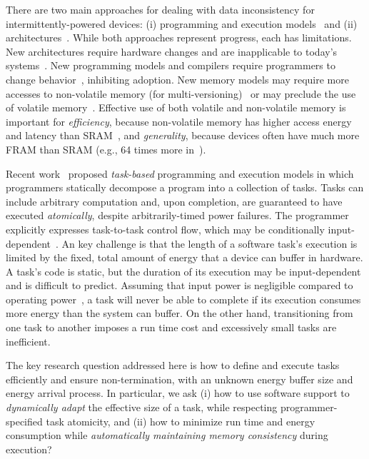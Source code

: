 There are two main approaches for dealing with data inconsistency for intermittently-powered devices: (i) programming and execution models~\cite{dino,ratchet,chain,alpaca} and (ii) architectures~\cite{hicks_isca_2017,idetic,nvp,tictpl}. While both approaches represent progress, each has limitations. New architectures require hardware changes and are inapplicable to today's systems~\cite{hicks_isca_2017,nvp}. New programming models and compilers require programmers to change behavior~\cite{chain,ratchet}, inhibiting adoption. New memory models may require more accesses to non-volatile memory (for multi-versioning)~\cite{dino,chain} or may preclude the use of volatile memory~\cite{ratchet}. Effective use of both volatile and non-volatile memory is important for \emph{efficiency}, because non-volatile memory has higher access energy and latency than SRAM~\cite{nvp}, and \emph{generality}, because devices often have much more FRAM than SRAM (e.g., 64 times more in~\cite{wolverine}). 

Recent work~\cite{alpaca,chain} proposed {\em task-based} programming and execution models in which programmers statically decompose a program into a collection of tasks. Tasks can include arbitrary computation and, upon completion, are guaranteed to have executed {\em atomically}, despite arbitrarily-timed power failures. The programmer explicitly expresses task-to-task control flow, which may be conditionally input-dependent~\cite{chain}. An key challenge is that the length of a software task's execution is limited by the fixed, total amount of energy that a device can buffer in hardware. A task's code is static, but the duration of its execution may be input-dependent and is difficult to predict. Assuming that input power is negligible compared to operating power~\cite{wisp}, a task will never be able to complete if its execution consumes more energy than the system can buffer. On the other hand, transitioning from one task to another imposes a run time cost and excessively small tasks are inefficient. 

The key research question addressed here is how to define and execute tasks efficiently and ensure non-termination, with an unknown energy buffer size and energy arrival process. In particular, we ask (i) how to use software support to \emph{dynamically adapt} the effective size of a task, while respecting programmer-specified task atomicity, and (ii) how to minimize run time and energy consumption while \emph{automatically maintaining memory consistency} during execution?

